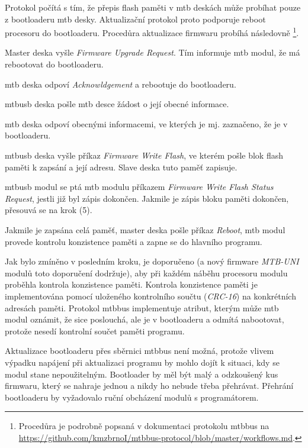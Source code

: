 Protokol počítá s tím, že přepis flash paměti v \gls{mtb} deskách může
probíhat pouze z bootloaderu \gls{mtb} desky. Aktualizační protokol proto
podporuje reboot procesoru do bootloaderu. Procedůra aktualizace firmwaru
probíhá následovně \footnote{Procedůra je podrobně popsaná v dokumentaci protokolu
\gls{mtbbus} na
\url{https://github.com/kmzbrnoI/mtbbus-protocol/blob/master/workflows.md}.}.

\begin{compactenum}
\item Master deska vyšle \textit{Firmware Upgrade Request}. Tím informuje \gls{mtb}
	modul, že má rebootovat do bootloaderu.
\item \gls{mtb} deska odpoví \textit{Acknowldgement} a rebootuje do bootloaderu.
\item \gls{mtbusb} deska pošle \gls{mtb} desce žádost o její obecné informace.
\item \gls{mtb} deska odpoví obecnými informacemi, ve kterých je mj. zaznačeno,
	že je v bootloaderu.
\item \gls{mtbusb} deska vyšle příkaz \textit{Firmware Write Flash}, ve kterém pošle
	blok flash paměti k zapsání a její adresu. Slave deska tuto paměť zapisuje.
\item \gls{mtbusb} modul se ptá \gls{mtb} modulu příkazem \textit{Firmware Write
	Flash Status Request}, jestli již byl zápis dokončen. Jakmile je zápis bloku
	paměti dokončen, přesouvá se na krok (5).
\item Jakmile je zapsána celá paměť, master deska pošle příkaz \textit{Reboot},
	\gls{mtb} modul provede kontrolu konzistence paměti a zapne se do hlavního
	programu.
\end{compactenum}

Jak bylo zmíněno v posledním kroku, je doporučeno (a nový firmware
\textit{MTB-UNI} modulů toto doporučení dodržuje), aby při každém náběhu
procesoru modulu proběhla kontrola konzistence paměti. Kontrola konzistence
paměti je implementována pomocí uloženého kontrolního součtu (\textit{CRC-16})
na konkrétních adresách paměti. Protokol \gls{mtbbus} implementuje atribut,
kterým může \gls{mtb} modul oznámit, že sice poslouchá, ale je v bootloaderu
a odmítá nabootovat, protože nesedí kontrolní součet paměti programu.

Aktualizace bootloaderu přes sběrnici \gls{mtbbus} není možná, protože vlivem
výpadku napájení při aktualizaci programu by mohlo dojít k situaci, kdy se modul
stane nepoužitelným. Bootloader by měl být malý a odzkoušený kus firmwaru, který
se nahraje jednou a nikdy ho nebude třeba přehrávat. Přehrání bootloaderu by
vyžadovalo ruční obcházení modulů s programátorem.


